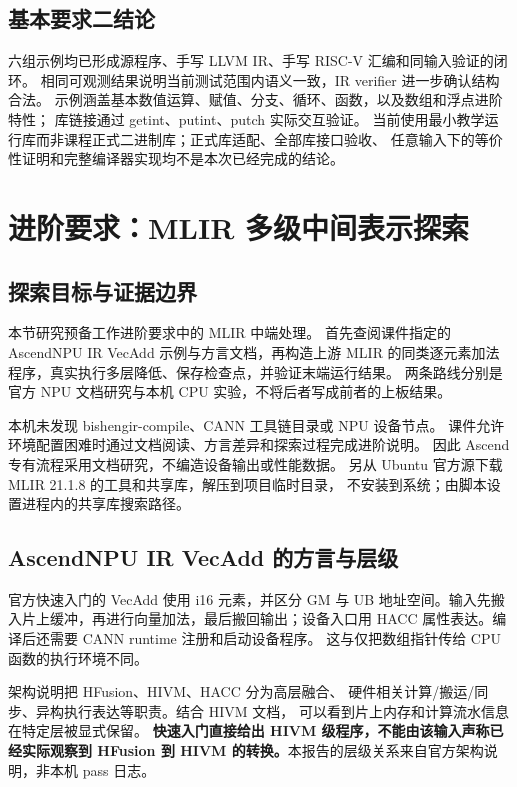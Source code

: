 \documentclass[UTF8,a4paper,11pt]{ctexart}
\begin{document}
\subsection{基本要求二结论}
六组示例均已形成源程序、手写 LLVM IR、手写 RISC-V 汇编和同输入验证的闭环。
相同可观测结果说明当前测试范围内语义一致，IR verifier 进一步确认结构合法。
示例涵盖基本数值运算、赋值、分支、循环、函数，以及数组和浮点进阶特性；
库链接通过 getint、putint、putch 实际交互验证。
当前使用最小教学运行库而非课程正式二进制库；正式库适配、全部库接口验收、
任意输入下的等价性证明和完整编译器实现均不是本次已经完成的结论。

\section{进阶要求：MLIR 多级中间表示探索}
\subsection{探索目标与证据边界}
本节研究预备工作进阶要求中的 MLIR 中端处理。
首先查阅课件指定的 AscendNPU IR VecAdd 示例与方言文档，再构造上游 MLIR
的同类逐元素加法程序，真实执行多层降低、保存检查点，并验证末端运行结果。
两条路线分别是官方 NPU 文档研究与本机 CPU 实验，不将后者写成前者的上板结果。

本机未发现 bishengir-compile、CANN 工具链目录或 NPU 设备节点。
课件允许环境配置困难时通过文档阅读、方言差异和探索过程完成进阶说明。
因此 Ascend 专有流程采用文档研究，不编造设备输出或性能数据。
另从 Ubuntu 官方源下载 MLIR 21.1.8 的工具和共享库，解压到项目临时目录，
不安装到系统；由脚本设置进程内的共享库搜索路径。

\subsection{AscendNPU IR VecAdd 的方言与层级}
官方快速入门\cite{ascendexample}的 VecAdd 使用 i16 元素，并区分 GM 与 UB
地址空间。输入先搬入片上缓冲，再进行向量加法，最后搬回输出；设备入口用
HACC 属性表达。编译后还需要 CANN runtime 注册和启动设备程序。
这与仅把数组指针传给 CPU 函数的执行环境不同。

架构说明\cite{ascendarchitecture}把 HFusion、HIVM、HACC 分为高层融合、
硬件相关计算/搬运/同步、异构执行表达等职责。结合 HIVM 文档\cite{hivmref}，
可以看到片上内存和计算流水信息在特定层被显式保留。
\textbf{快速入门直接给出 HIVM 级程序，不能由该输入声称已经实际观察到
HFusion 到 HIVM 的转换。}本报告的层级关系来自官方架构说明，非本机 pass 日志。
\end{document}
